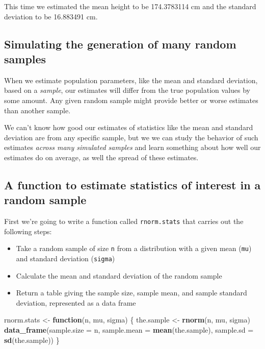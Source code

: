 \documentclass[]{book}
\newenvironment{Shaded}{\begin{snugshade}}{\end{snugshade}}
\newcommand{\ControlFlowTok}[1]{\textcolor[rgb]{0.13,0.29,0.53}{\textbf{#1}}}
\newcommand{\DataTypeTok}[1]{\textcolor[rgb]{0.13,0.29,0.53}{#1}}
\newcommand{\KeywordTok}[1]{\textcolor[rgb]{0.13,0.29,0.53}{\textbf{#1}}}
\newcommand{\NormalTok}[1]{#1}
\newcommand{\StringTok}[1]{\textcolor[rgb]{0.31,0.60,0.02}{#1}}
\providecommand{\tightlist}{%
  \setlength{\itemsep}{0pt}\setlength{\parskip}{0pt}}
\theoremstyle{definition}
\theoremstyle{definition}
\theoremstyle{definition}
\theoremstyle{remark}
\begin{document}
This time we estimated the mean height to be 174.3783114 cm and the
standard deviation to be 16.883491 cm.

\hypertarget{simulating-the-generation-of-many-random-samples}{%
\subsection{Simulating the generation of many random
samples}\label{simulating-the-generation-of-many-random-samples}}

When we estimate population parameters, like the mean and standard
deviation, based on a \emph{sample}, our estimates will differ from the
true population values by some amount. Any given random sample might
provide better or worse estimates than another sample.

We can't know how good our estimates of statistics like the mean and
standard deviation are from any specific sample, but we we can study the
behavior of such estimates \emph{across many simulated samples} and
learn something about how well our estimates do on average, as well the
spread of these estimates.

\hypertarget{a-function-to-estimate-statistics-of-interest-in-a-random-sample}{%
\subsection{A function to estimate statistics of interest in a random
sample}\label{a-function-to-estimate-statistics-of-interest-in-a-random-sample}}

First we're going to write a function called \texttt{rnorm.stats} that
carries out the following steps:

\begin{itemize}
\tightlist
\item
  Take a random sample of size \texttt{n} from a distribution with a
  given mean (\texttt{mu}) and standard deviation (\texttt{sigma})
\item
  Calculate the mean and standard deviation of the random sample
\item
  Return a table giving the sample size, sample mean, and sample
  standard deviation, represented as a data frame
\end{itemize}

\begin{Shaded}
\begin{Highlighting}[]
\NormalTok{rnorm.stats <-}\StringTok{ }\ControlFlowTok{function}\NormalTok{(n, mu, sigma) \{}
\NormalTok{  the.sample <-}\StringTok{ }\KeywordTok{rnorm}\NormalTok{(n, mu, sigma)}
  \KeywordTok{data_frame}\NormalTok{(}\DataTypeTok{sample.size =}\NormalTok{ n, }
             \DataTypeTok{sample.mean =} \KeywordTok{mean}\NormalTok{(the.sample), }
             \DataTypeTok{sample.sd =} \KeywordTok{sd}\NormalTok{(the.sample))}
\NormalTok{\}}
\end{Highlighting}
\end{Shaded}
\end{document}

